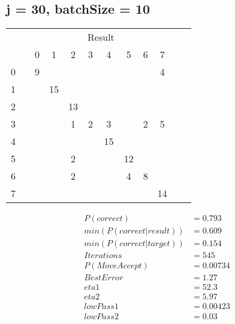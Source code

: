 \documentclass[10pt, conference, compsocconf]{IEEEtran}
\begin{document}
\subsection{j = 30, batchSize = 10}
\begin{center}
\begin{tabular}{l*{10}{c}r}
& & & & & \multicolumn{2}{c}{Result}  & & \\
 &\vline& 0 & 1 & 2 & 3 & 4 & 5 & 6 & 7 \\
\hline
0 &\vline&  9&    &    &    &    &    &    &   4 \\
 1 &\vline&   &  15&    &    &    &    &    &    \\
 2 &\vline&   &    &  13&    &    &    &    &    \\
 3 &\vline&   &    &   1&   2&   3&    &   2&   5 \\
 4 &\vline&   &    &    &    &  15&    &    &    \\
 5 &\vline&   &    &   2&    &    &  12&    &    \\
 6 &\vline&   &    &   2&    &    &   4&   8&    \\
 7 &\vline&   &    &    &    &    &    &    &  14 \\
\end{tabular}
\begin{align}
P( correct )  &=   0.793\\
min( P( correct |  result  ) )  &=   0.609\\
min( P( correct | target ) )  &=   0.154\\
Iterations &=  545\\
P(Move Accept) &=  0.00734\\
Best Error &=  1.27\\
eta1    &=  52.3\\
eta2    &=  5.97\\
lowPass1 &= 0.00423\\
lowPass2 &= 0.03
\end{align}
\end{center}
\end{document}
